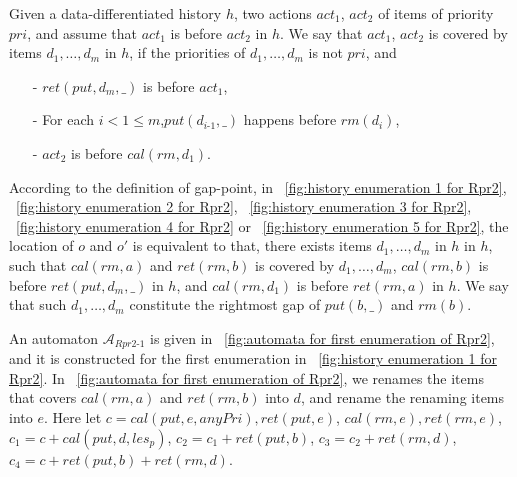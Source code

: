 \documentclass{llncs}
\begin{document}
Given a data-differentiated history $h$, two actions $\textit{act}_1$, $\textit{act}_2$ of items of priority $\textit{pri}$, and assume that $\textit{act}_1$ is before $\textit{act}_2$ in $h$. We say that $\textit{act}_1$, $\textit{act}_2$ is covered by items $d_1,\ldots,d_m$ in $h$, if the priorities of $d_1,\ldots,d_m$ is not $\textit{pri}$, and

\begin{itemize}
\setlength{\itemsep}{0.5pt}
\item[-] $\textit{ret}(\textit{put},d_m,\_)$ is before $\textit{act}_1$,

\item[-] For each $i < 1 \leq m$,$\textit{put}(d_{\textit{i-1}},\_)$ happens before $\textit{rm}(d_i)$,

\item[-] $\textit{act}_2$ is before $\textit{cal}(\textit{rm},d_1)$.
\end{itemize}

According to the definition of gap-point, in \figurename~\ref{fig:history enumeration 1 for Rpr2}, \figurename~\ref{fig:history enumeration 2 for Rpr2}, \figurename~\ref{fig:history enumeration 3 for Rpr2}, \figurename~\ref{fig:history enumeration 4 for Rpr2} or \figurename~\ref{fig:history enumeration 5 for Rpr2}, the location of $o$ and $o'$ is equivalent to that, there exists items $d_1,\ldots,d_m$ in $h$ in $h$, such that $\textit{cal}(\textit{rm},a)$ and $\textit{ret}(\textit{rm},b)$ is covered by $d_1,\ldots,d_m$, $\textit{cal}(\textit{rm},b)$ is before $\textit{ret}(\textit{put},d_m,\_)$ in $h$, and $\textit{cal}(\textit{rm},d_1)$ is before $\textit{ret}(\textit{rm},a)$ in $h$. We say that such $d_1,\ldots,d_m$ constitute the rightmost gap of $\textit{put}(b,\_)$ and $\textit{rm}(b)$.

An automaton $\mathcal{A}_{\textit{Rpr2-1}}$ is given in \figurename~\ref{fig:automata for first enumeration of Rpr2}, and it is constructed for the first enumeration in \figurename~\ref{fig:history enumeration 1 for Rpr2}. In \figurename~\ref{fig:automata for first enumeration of Rpr2}, we renames the items that covers $\textit{cal}(\textit{rm},a)$ and $\textit{ret}(\textit{rm},b)$ into $d$, and rename the renaming items into $e$. Here let $c = \textit{cal}(\textit{put},e,\textit{anyPri}),\textit{ret}(\textit{put},e)$, $\textit{cal}(\textit{rm},e), \textit{ret}(\textit{rm},e)$, $c_1 = c + \textit{cal}(\textit{put},d,\textit{les}_p)$, $c_2 = c_1 + \textit{ret}(\textit{put},b)$, $c_3 = c_2 + \textit{ret}(\textit{rm},d)$, $c_4 = c + \textit{ret}(\textit{put},b) + \textit{ret}(\textit{rm},d)$.
\end{document}
